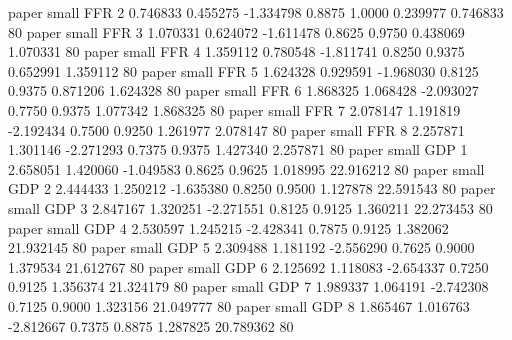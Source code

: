          paper      small      FFR                 2 0.746833 0.455275 -1.334798 0.8875 1.0000  0.239977    0.746833 80
         paper      small      FFR                 3 1.070331 0.624072 -1.611478 0.8625 0.9750  0.438069    1.070331 80
         paper      small      FFR                 4 1.359112 0.780548 -1.811741 0.8250 0.9375  0.652991    1.359112 80
         paper      small      FFR                 5 1.624328 0.929591 -1.968030 0.8125 0.9375  0.871206    1.624328 80
         paper      small      FFR                 6 1.868325 1.068428 -2.093027 0.7750 0.9375  1.077342    1.868325 80
         paper      small      FFR                 7 2.078147 1.191819 -2.192434 0.7500 0.9250  1.261977    2.078147 80
         paper      small      FFR                 8 2.257871 1.301146 -2.271293 0.7375 0.9375  1.427340    2.257871 80
         paper      small      GDP                 1 2.658051 1.420060 -1.049583 0.8625 0.9625  1.018995   22.916212 80
         paper      small      GDP                 2 2.444433 1.250212 -1.635380 0.8250 0.9500  1.127878   22.591543 80
         paper      small      GDP                 3 2.847167 1.320251 -2.271551 0.8125 0.9125  1.360211   22.273453 80
         paper      small      GDP                 4 2.530597 1.245215 -2.428341 0.7875 0.9125  1.382062   21.932145 80
         paper      small      GDP                 5 2.309488 1.181192 -2.556290 0.7625 0.9000  1.379534   21.612767 80
         paper      small      GDP                 6 2.125692 1.118083 -2.654337 0.7250 0.9125  1.356374   21.324179 80
         paper      small      GDP                 7 1.989337 1.064191 -2.742308 0.7125 0.9000  1.323156   21.049777 80
         paper      small      GDP                 8 1.865467 1.016763 -2.812667 0.7375 0.8875  1.287825   20.789362 80